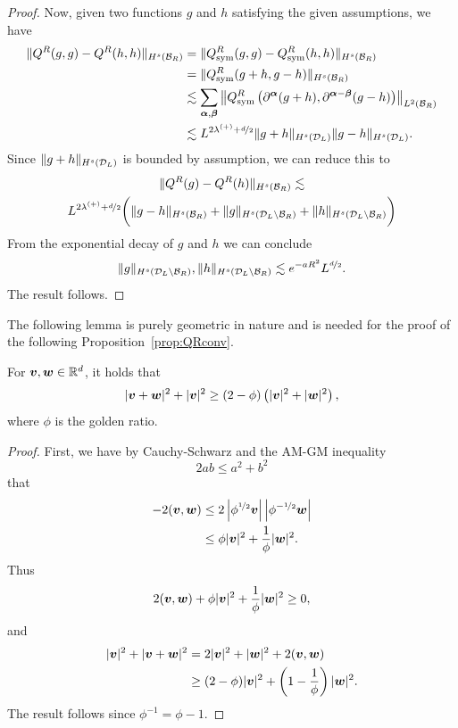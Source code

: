 \begin{proof}
    Now, given two functions $g$ and $h$ satisfying the given assumptions, we
    have
    \begin{align*}
        \|Q^R(g,g) - Q^R(h,h)\|_{H^s(\mathcal{B}_R)} & = \|Q_{\mathrm{sym}}^R(g,g) -
                Q_{\mathrm{sym}}^R(h,h)\|_{H^s(\mathcal{B}_R)} \\
        & = \|Q_{\mathrm{sym}}^R(g+h,g-h)\|_{H^s(\mathcal{B}_R)} \\
        & \lesssim \sum_{{\bm\alpha},{\bm\beta}} \left\|Q^R_{\mathrm{sym}}\left(
            \partial^{\bm\alpha}(g+h), \partial^{{\bm\alpha}-{\bm\beta}}(g-h) 
            \right)\right\|_{L^2(\mathcal{B}_R)} \\
        & \lesssim L^{2\lambda^{(+)}+\nicefrac{d}{2}} 
                \|g+h\|_{H^s(\mathcal{D}_L)} \|g-h\|_{H^s(\mathcal{D}_L)}.
    \end{align*}
    Since $\|g+h\|_{H^s(\mathcal{D}_L)}$ is bounded by assumption, we can reduce this to
    \begin{multline*}
        \|Q^R(g) - Q^R(h)\|_{H^s(\mathcal{B}_R)} \lesssim \\
                L^{2\lambda^{(+)}+\nicefrac{d}{2}}
                \bigg(\|g-h\|_{H^s(\mathcal{B}_R)} + \|g\|_{H^s(\mathcal{D}_L\backslash\mathcal{B}_R)} +
                \|h\|_{H^s(\mathcal{D}_L\backslash\mathcal{B}_R)}\bigg)
    \end{multline*}
    From the exponential decay of $g$ and $h$ we can conclude
    \[
        \|g\|_{H^s(\mathcal{D}_L\backslash\mathcal{B}_R)}, \|h\|_{H^s(\mathcal{D}_L\backslash\mathcal{B}_R)} 
        \lesssim e^{-aR^2}L^{\nicefrac{d}{2}}.
    \]
    The result follows.
\end{proof}

The following lemma is purely geometric in nature and is needed for the proof of the
following Proposition~\ref{prop:QRconv}.
\begin{lemma} \label{lem:vxy}
For ${\bm v},{\bm w}\in\mathbb{R}^d$, it holds that
\[
    |{\bm v}+{\bm w}|^2 + |{\bm v}|^2 \geq (2-\phi)\left(|{\bm v}|^2 + |{\bm w}|^2\right),
\]
where $\phi$ is the golden ratio.
\end{lemma}
\begin{proof}
    First, we have by Cauchy-Schwarz and the AM-GM inequality 
    \[
        2ab \leq a^2+b^2
    \]
    that
    \begin{align*}
        -2({\bm v},{\bm w}) & \leq 2\left|\phi^{\nicefrac{1}{2}}{\bm v}\right|\left|\phi^{-\nicefrac{1}{2}}{\bm w}\right| \\
        & \leq \phi|{\bm v}|^2 + \frac{1}{\phi}|{\bm w}|^2.
    \end{align*}
    Thus
    \[
        2({\bm v},{\bm w}) + \phi|{\bm v}|^2 + \frac{1}{\phi}|{\bm w}|^2 \geq 0,
    \]
    and
    \begin{align*}
        |{\bm v}|^2 + |{\bm v}+{\bm w}|^2 & = 2|{\bm v}|^2 + |{\bm w}|^2 + 2({\bm v},{\bm w}) \\
        & \geq (2-\phi)|{\bm v}|^2 + \left(1-\frac{1}{\phi}\right)|{\bm w}|^2.
    \end{align*}
    The result follows since $\phi^{-1}=\phi-1$.
\end{proof}


